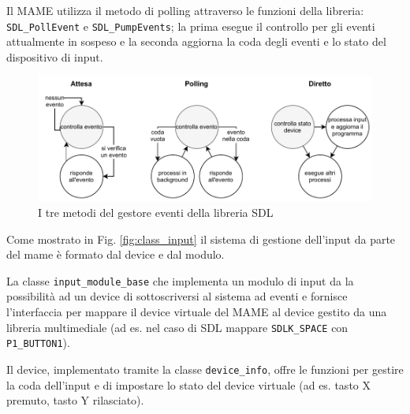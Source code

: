 Il MAME utilizza il metodo di polling attraverso le funzioni della libreria: \verb|SDL_PollEvent| e \verb|SDL_PumpEvents|; la prima esegue il controllo per gli eventi attualmente in sospeso e la seconda aggiorna la coda degli eventi e lo stato del dispositivo di input.

\begin{figure}[H]
	\includegraphics[width=\linewidth]{immagini/input_event_mode}
	\caption{I tre metodi del gestore eventi della libreria SDL}
	\label{fig:input_event_mode}
\end{figure}


Come mostrato in Fig. \ref{fig:class_input} il sistema di gestione dell'input da parte del mame è formato dal device e dal modulo.

La classe \verb|input_module_base| che implementa un modulo di input da la possibilità ad un device di sottoscriversi al sistema ad eventi e fornisce l'interfaccia per mappare il device virtuale del MAME al device gestito da una libreria multimediale (ad es. nel caso di SDL mappare \verb|SDLK_SPACE| con \verb|P1_BUTTON1|).

Il device, implementato tramite la classe \verb|device_info|, offre le funzioni per gestire la coda dell'input e di impostare lo stato del device virtuale (ad es. tasto X premuto, tasto Y rilasciato).

